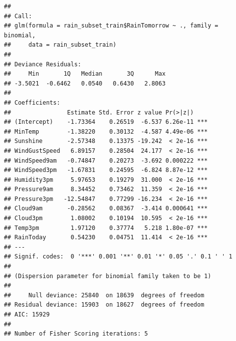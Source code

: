 \documentclass[
]{article}
\begin{document}
\begin{verbatim}
## 
## Call:
## glm(formula = rain_subset_train$RainTomorrow ~ ., family = binomial, 
##     data = rain_subset_train)
## 
## Deviance Residuals: 
##     Min       1Q   Median       3Q      Max  
## -3.5021  -0.6462   0.0540   0.6430   2.8063  
## 
## Coefficients:
##                Estimate Std. Error z value Pr(>|z|)    
## (Intercept)    -1.73364    0.26519  -6.537 6.26e-11 ***
## MinTemp        -1.38220    0.30132  -4.587 4.49e-06 ***
## Sunshine       -2.57348    0.13375 -19.242  < 2e-16 ***
## WindGustSpeed   6.89157    0.28504  24.177  < 2e-16 ***
## WindSpeed9am   -0.74847    0.20273  -3.692 0.000222 ***
## WindSpeed3pm   -1.67831    0.24595  -6.824 8.87e-12 ***
## Humidity3pm     5.97653    0.19279  31.000  < 2e-16 ***
## Pressure9am     8.34452    0.73462  11.359  < 2e-16 ***
## Pressure3pm   -12.54847    0.77299 -16.234  < 2e-16 ***
## Cloud9am       -0.28562    0.08367  -3.414 0.000641 ***
## Cloud3pm        1.08002    0.10194  10.595  < 2e-16 ***
## Temp3pm         1.97120    0.37774   5.218 1.80e-07 ***
## RainToday       0.54230    0.04751  11.414  < 2e-16 ***
## ---
## Signif. codes:  0 '***' 0.001 '**' 0.01 '*' 0.05 '.' 0.1 ' ' 1
## 
## (Dispersion parameter for binomial family taken to be 1)
## 
##     Null deviance: 25840  on 18639  degrees of freedom
## Residual deviance: 15903  on 18627  degrees of freedom
## AIC: 15929
## 
## Number of Fisher Scoring iterations: 5
\end{verbatim}
\end{document}
